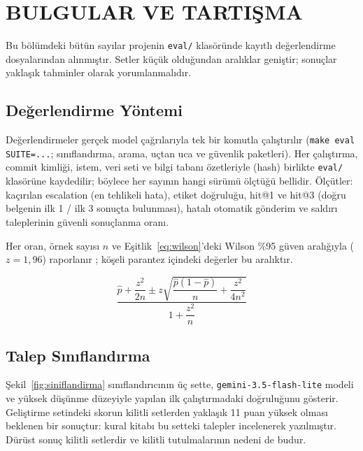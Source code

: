 \chapter{BULGULAR VE TARTIŞMA}
\label{ch:bulgular}

Bu bölümdeki bütün sayılar projenin \texttt{eval/} klasöründe kayıtlı değerlendirme dosyalarından
alınmıştır. Setler küçük olduğundan aralıklar geniştir; sonuçlar yaklaşık tahminler olarak
yorumlanmalıdır.

\section{Değerlendirme Yöntemi}

Değerlendirmeler gerçek model çağrılarıyla tek bir komutla çalıştırılır
(\texttt{make eval SUITE=...}; sınıflandırma, arama, uçtan uca ve güvenlik paketleri). Her çalıştırma, commit kimliği,
istem, veri seti ve bilgi tabanı özetleriyle (hash) birlikte \texttt{eval/} klasörüne kaydedilir;
böylece her sayının hangi sürümü ölçtüğü bellidir. Ölçütler: kaçırılan escalation (en tehlikeli
hata), etiket doğruluğu, hit@1 ve hit@3 (doğru belgenin ilk 1 / ilk 3 sonuçta bulunması), hatalı
otomatik gönderim ve saldırı taleplerinin güvenli sonuçlanma oranı.

Her oran, örnek sayısı $n$ ve Eşitlik~\ref{eq:wilson}'deki Wilson \%95 güven aralığıyla
($z = 1{,}96$) raporlanır \cite{wilson1927}; köşeli parantez içindeki değerler bu aralıktır.

\begin{equation}
  \frac{\hat{p} + \dfrac{z^2}{2n} \pm z\sqrt{\dfrac{\hat{p}(1-\hat{p})}{n} + \dfrac{z^2}{4n^2}}}{1 + \dfrac{z^2}{n}}
  \label{eq:wilson}
\end{equation}

\section{Talep Sınıflandırma}

Şekil~\ref{fig:siniflandirma} sınıflandırıcının üç sette, \texttt{gemini-3.5-flash-lite} modeli ve
yüksek düşünme düzeyiyle yapılan ilk çalıştırmadaki doğruluğunu gösterir. Geliştirme setindeki skorun
kilitli setlerden yaklaşık 11 puan yüksek olması beklenen bir sonuçtur: kural kitabı bu setteki
talepler incelenerek yazılmıştır. Dürüst sonuç kilitli setlerdir ve kilitli tutulmalarının nedeni de
budur.

